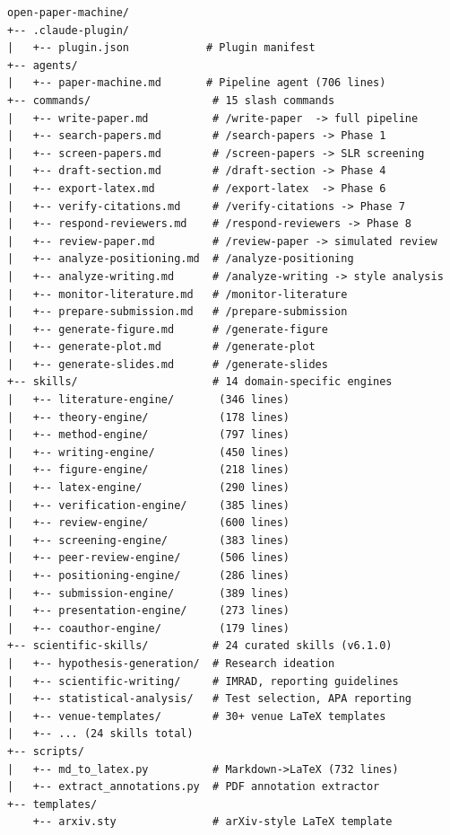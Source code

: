 \documentclass{article}
\begin{document}
\begin{lstlisting}[caption={Directory structure of the Open Academic Paper Machine plugin (v6.1.0). The system comprises 14 skill engines, 24 curated scientific skills, 15 slash commands, 1 pipeline agent, 2 utility scripts, and 1 \LaTeX\ template.},label={lst:tree},float=t]
open-paper-machine/
+-- .claude-plugin/
|   +-- plugin.json            # Plugin manifest
+-- agents/
|   +-- paper-machine.md       # Pipeline agent (706 lines)
+-- commands/                   # 15 slash commands
|   +-- write-paper.md          # /write-paper  -> full pipeline
|   +-- search-papers.md        # /search-papers -> Phase 1
|   +-- screen-papers.md        # /screen-papers -> SLR screening
|   +-- draft-section.md        # /draft-section -> Phase 4
|   +-- export-latex.md         # /export-latex  -> Phase 6
|   +-- verify-citations.md     # /verify-citations -> Phase 7
|   +-- respond-reviewers.md    # /respond-reviewers -> Phase 8
|   +-- review-paper.md         # /review-paper -> simulated review
|   +-- analyze-positioning.md  # /analyze-positioning
|   +-- analyze-writing.md      # /analyze-writing -> style analysis
|   +-- monitor-literature.md   # /monitor-literature
|   +-- prepare-submission.md   # /prepare-submission
|   +-- generate-figure.md      # /generate-figure
|   +-- generate-plot.md        # /generate-plot
|   +-- generate-slides.md      # /generate-slides
+-- skills/                     # 14 domain-specific engines
|   +-- literature-engine/       (346 lines)
|   +-- theory-engine/           (178 lines)
|   +-- method-engine/           (797 lines)
|   +-- writing-engine/          (450 lines)
|   +-- figure-engine/           (218 lines)
|   +-- latex-engine/            (290 lines)
|   +-- verification-engine/     (385 lines)
|   +-- review-engine/           (600 lines)
|   +-- screening-engine/        (383 lines)
|   +-- peer-review-engine/      (506 lines)
|   +-- positioning-engine/      (286 lines)
|   +-- submission-engine/       (389 lines)
|   +-- presentation-engine/     (273 lines)
|   +-- coauthor-engine/         (179 lines)
+-- scientific-skills/          # 24 curated skills (v6.1.0)
|   +-- hypothesis-generation/  # Research ideation
|   +-- scientific-writing/     # IMRAD, reporting guidelines
|   +-- statistical-analysis/   # Test selection, APA reporting
|   +-- venue-templates/        # 30+ venue LaTeX templates
|   +-- ... (24 skills total)
+-- scripts/
|   +-- md_to_latex.py          # Markdown->LaTeX (732 lines)
|   +-- extract_annotations.py  # PDF annotation extractor
+-- templates/
    +-- arxiv.sty               # arXiv-style LaTeX template
\end{lstlisting}
\end{document}
